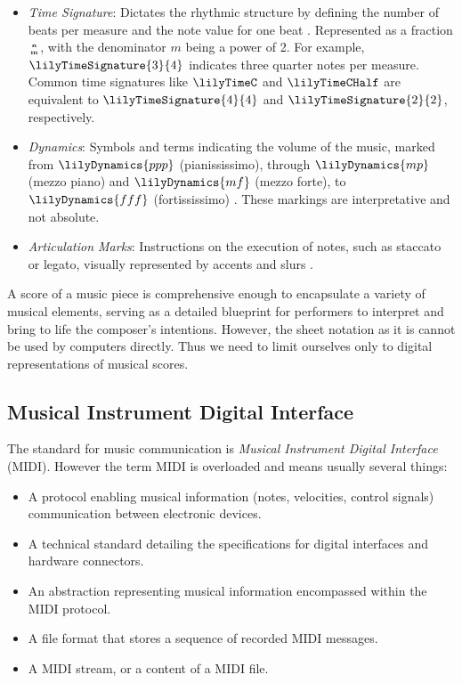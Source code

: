 \begin{itemize}
   \item \emph{Time Signature}: Dictates the rhythmic structure by defining the number of beats per measure and the note value for one beat \cite[p.~148--150]{Read1969}. Represented as a fraction $\mathbf{\genfrac{}{}{0pt}{2}{n}{m}}$, with the denominator $m$ being a power of 2. For example, $\lilyTimeSignature{3}{4}$ indicates three quarter notes per measure. Common time signatures like $\lilyTimeC$ and $\lilyTimeCHalf$ are equivalent to $\lilyTimeSignature{4}{4}$ and $\lilyTimeSignature{2}{2}$, respectively.
   \item \emph{Dynamics}: Symbols and terms indicating the volume of the music, marked from $\lilyDynamics{ppp}$ (pianississimo), through $\lilyDynamics{mp}$ (mezzo piano) and $\lilyDynamics{mf}$ (mezzo forte), to $\lilyDynamics{fff}$ (fortississimo) \cite[p.~250]{Read1969}. These markings are interpretative and not absolute.
   \item \emph{Articulation Marks}: Instructions on the execution of notes, such as staccato or legato, visually represented by accents and slurs \cite[p.~260--268]{Read1969}.
\end{itemize}

A score of a music piece is comprehensive enough to encapsulate a variety of musical elements, serving as a detailed blueprint for performers to interpret and bring to life the composer's intentions. However, the sheet notation as it is cannot be used by computers directly. Thus we need to limit ourselves only to digital representations of musical scores.

\subsection{Musical Instrument Digital Interface}

The standard for music communication is \emph{Musical Instrument Digital Interface} (MIDI). However the term MIDI is overloaded and means usually several things:
\begin{itemize}
   \item A protocol enabling musical information (notes, velocities, control signals) communication between electronic devices.
   \item A technical standard detailing the specifications for digital interfaces and hardware connectors.
   \item An abstraction representing musical information encompassed within the MIDI protocol.
   \item A file format that stores a sequence of recorded MIDI messages.
   \item A MIDI stream, or a content of a MIDI file.
\end{itemize}

